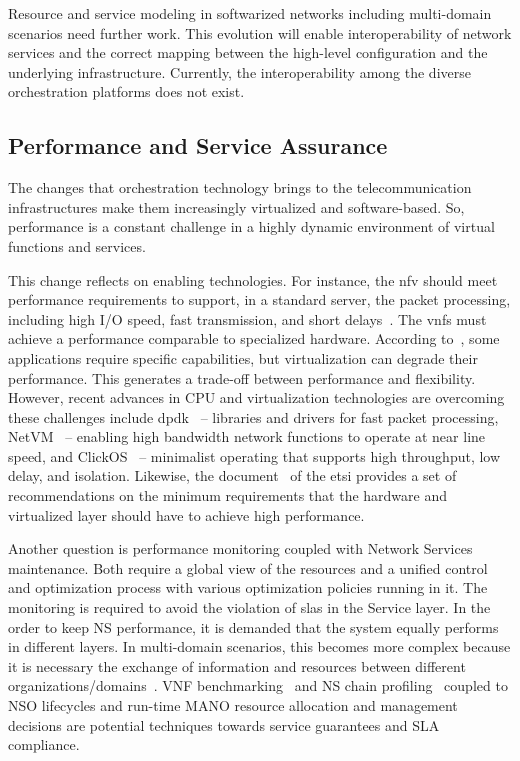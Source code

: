 Resource and service modeling in softwarized networks including multi-domain scenarios need further work. This evolution will enable interoperability of network services and the correct mapping between the high-level configuration and the underlying infrastructure. Currently, the interoperability among the diverse orchestration platforms does not exist.

\subsection{Performance and  Service Assurance}

The changes that orchestration technology brings to the telecommunication infrastructures make them increasingly virtualized and software-based. So, performance is a constant challenge in a highly dynamic environment of virtual functions and services.  

This change reflects on enabling technologies. For instance, the \gls{nfv} should meet performance requirements to support, in a standard server, the packet processing, including high I/O speed, fast transmission, and short delays~\cite{YongLi2015Software-DefinedSurvey}. The \glspl{vnf} must achieve a performance comparable to specialized hardware. According to~\cite{Mijumbi2016NetworkChallenges}, some applications require specific capabilities, but virtualization can degrade their performance. This generates a trade-off between performance and flexibility. However, recent advances in CPU and virtualization technologies are overcoming these challenges include \gls{dpdk}~\cite{LinuxFoundationDPDKKit} -- libraries and drivers for fast packet processing, NetVM~\cite{7036139} -- enabling high bandwidth network functions to operate at near line speed, and ClickOS~\cite{Martins:2014:CAN:2616448.2616491} -- minimalist operating that supports high throughput, low delay, and isolation. Likewise, the document~\cite{ETSIGSPractises} of the \gls{etsi}  provides a set of recommendations on the minimum requirements that the hardware and virtualized layer should have to achieve high performance.

Another question is performance monitoring coupled with Network Services maintenance. Both require a global view of the resources and a unified control and optimization process with various optimization policies running in it. The monitoring is required to avoid the violation of \glspl{sla} in the Service layer. In the order to keep NS performance, it is demanded that the system equally performs in different layers. In multi-domain scenarios, this becomes more complex because it is necessary the exchange of information and resources between different organizations/domains~\cite{md2}. 
VNF benchmarking~\cite{7313620} and NS chain profiling~\cite{7956044} coupled to NSO lifecycles and run-time MANO resource allocation and management decisions are potential techniques towards service guarantees and SLA compliance.  

